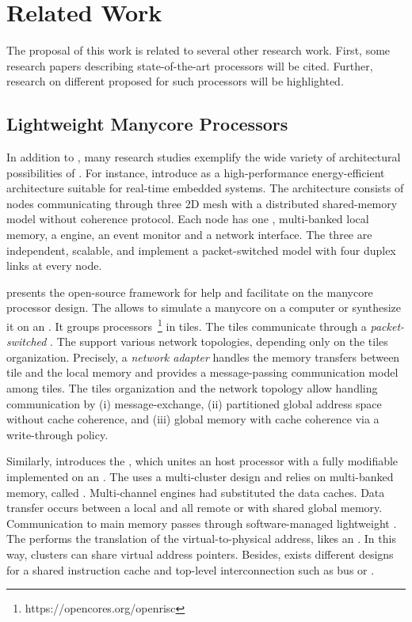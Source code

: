 \chapter{Related Work}
\label{ch.related-work}

The proposal of this work is related to several other research work.
First, some research papers describing state-of-the-art \lightweight \manycores
processors will be cited. Further, research on different \oss
proposed for such processors will be highlighted.

\section{Lightweight Manycore Processors}
\label{sec.works.manycores}

	In addition to \mppa, many research studies exemplify the wide variety of
	architectural possibilities of \lightweight \manycores.
	For instance,  introduce \epiphany as a
	high-performance energy-efficient \manycore architecture suitable for
	real-time embedded systems.
	The architecture consists of nodes communicating through three 2D mesh \nocs
	with a distributed shared-memory model without coherence protocol.
	Each node has one \risc \cpu, multi-banked local memory, a \dma engine,
	an event monitor and a network interface.
	The three \nocs are independent, scalable, and implement a packet-switched
	model with four duplex links at every node.

	 presents the open-source \optimsoc framework
	for help and facilitate on the manycore processor design. The \optimsoc
	allows to simulate a manycore on a computer or synthesize it on an \fpga.
	It groups \openrisc processors~\footnote{https://opencores.org/openrisc} in tiles.
	The tiles communicate through a \textit{packet-switched \noc}.
	The \noc support various network topologies, depending only on the tiles organization.
	Precisely, a \textit{network adapter} handles the memory transfers between
	tile and the local memory and provides a message-passing communication
	model among tiles.
	The tiles organization and the network topology allow handling
	communication by (i) message-exchange, (ii) partitioned global
	address space without cache coherence, and (iii) global memory
	with cache coherence via a write-through policy.

	Similarly,  introduces the \hero, which
	unites an \arm host processor with a fully modifiable
	\riscv \manycore implemented on an \fpga. The \pmca uses a
	multi-cluster design and relies on multi-banked memory, called \spm.
	Multi-channel \dma engines had substituted the data caches.
	Data transfer occurs between a local \spm and all remote \spms or
	with shared global memory. Communication to main memory passes
	through software-managed lightweight \rab. The \rab performs the
	translation of the virtual-to-physical address, likes an \mmu.
	In this way, clusters can share virtual address pointers.
	Besides, exists different designs for a shared instruction
	cache and top-level interconnection such as bus or \noc.

